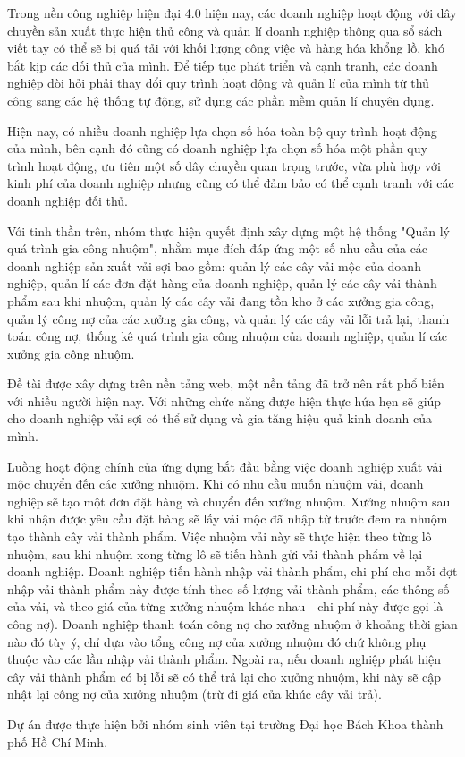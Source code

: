 Trong nền công nghiệp hiện đại 4.0 hiện nay, các doanh nghiệp hoạt động với dây chuyền sản xuất thực hiện thủ công và quản lí doanh nghiệp thông qua sổ sách viết tay có thể sẽ bị quá tải với khối lượng công việc và hàng hóa khổng lồ, khó bắt kịp các đối thủ của mình. Để tiếp tục phát triển và cạnh tranh, các doanh nghiệp đòi hỏi phải thay đổi quy trình hoạt động và quản lí của mình từ thủ công sang các hệ thống tự động, sử dụng các phần mềm quản lí chuyên dụng. \par

Hiện nay, có nhiều doanh nghiệp lựa chọn số hóa toàn bộ quy trình hoạt động của mình, bên cạnh đó cũng có doanh nghiệp lựa chọn số hóa một phần quy trình hoạt động, ưu tiên một số dây chuyền quan trọng trước, vừa phù hợp với kinh phí của doanh nghiệp nhưng cũng có thể đảm bảo có thể cạnh tranh với các doanh nghiệp đối thủ. \par

Với tinh thần trên, nhóm thực hiện quyết định xây dựng một hệ thống "Quản lý quá trình gia công nhuộm", nhằm mục đích đáp ứng một số nhu cầu của các doanh nghiệp sản xuất vải sợi bao gồm: quản lý các cây vải mộc của doanh nghiệp, quản lí các đơn đặt hàng của doanh nghiệp, quản lý các cây vải thành phẩm sau khi nhuộm, quản lý các cây vải đang tồn kho ở các xưởng gia công, quản lý công nợ của các xưởng gia công, và quản lý các cây vải lỗi trả lại, thanh toán công nợ, thống kê quá trình gia công nhuộm của doanh nghiệp, quản lí các xưởng gia công nhuộm. \par

Đề tài được xây dựng trên nền tảng web, một nền tảng đã trở nên rất phổ biến với nhiều người hiện nay. Với những chức năng được hiện thực hứa hẹn sẽ giúp cho doanh nghiệp vải sợi có thể sử dụng và gia tăng hiệu quả kinh doanh của mình.

Luồng hoạt động chính của ứng dụng bắt đầu bằng việc doanh nghiệp xuất vải mộc chuyển đến các xưởng nhuộm. Khi có nhu cầu muốn nhuộm vải, doanh nghiệp sẽ tạo một đơn đặt hàng và chuyển đến xưởng nhuộm. Xưởng nhuộm sau khi nhận được yêu cầu đặt hàng sẽ lấy vải mộc đã nhập từ trước đem ra nhuộm tạo thành cây vải thành phẩm. Việc nhuộm vải này sẽ thực hiện theo từng lô nhuộm, sau khi nhuộm xong từng lô sẽ tiến hành gửi vải thành phẩm về lại doanh nghiệp. Doanh nghiệp tiến hành nhập vải thành phẩm, chi phí cho mỗi đợt nhập vải thành phẩm này được tính theo số lượng vải thành phẩm, các thông số của vải, và theo giá của từng xưởng nhuộm khác nhau - chi phí này được gọi là công nợ). Doanh nghiệp  thanh toán công nợ cho xưởng nhuộm ở khoảng thời gian nào đó tùy ý, chỉ dựa vào tổng công nợ của xưởng nhuộm đó chứ không phụ thuộc vào các lần nhập vải thành phẩm. Ngoài ra, nếu doanh nghiệp phát hiện cây vải thành phẩm có bị lỗi sẽ có thể trả lại cho xưởng nhuộm, khi này sẽ cập nhật lại công nợ của xưởng nhuộm (trừ đi giá của khúc cây vải trả).

Dự án được thực hiện bởi nhóm sinh viên tại trường Đại học Bách Khoa thành phố Hồ Chí Minh.  \par